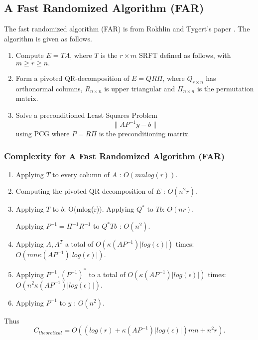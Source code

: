 \subsection{A Fast Randomized Algorithm (FAR)}
The fast randomized algorithm (FAR) is from Rokhlin and Tygert's paper \cite{SRFT2008}. The algorithm is given as follows.
\begin{tcolorbox}
\begin{enumerate}
\item Compute $E = TA$, where $T$ is the $r \times m$ SRFT defined as follows, with $m \geq r \geq n. $ \\
\item Form a pivoted QR-decomposition of $E = Q R \Pi$,  where $Q_{r \times n}$ has orthonormal columns, $R_{n \times n}$ is upper triangular and $\Pi_{n \times n}$ is the permutation matrix.  \\
\item Solve a preconditioned Least Squares Problem
$$
\| AP^{-1} y - b\|
$$
using PCG where $P = R \Pi$ is the preconditioning matrix.
\end{enumerate}
\end{tcolorbox}


\subsubsection{Complexity for A Fast Randomized Algorithm (FAR)}
\begin{tcolorbox}
\begin{enumerate}
\item Applying $T$ to every column of $A$ : $O(mnlog(r))$.  \\
\item Computing the pivoted QR decomposition of $E$ : $O(n^2r) . $ \\
\item Applying $T$ to $b$: O(mlog(r)). Applying $Q^*$ to $Tb$: $O(nr)$.

 Applying $P^{-1} = \Pi^{-1} R^{-1}$ to $Q^* Tb$ : $O(n^2). $ \\
\item Applying $A,A^T$ a total of $O(\kappa(AP^{-1}) |log(\epsilon)|)$ times: {\color{red}$O(mn\kappa(AP^{-1}) |log(\epsilon)|).$} \\
\item Applying $P^{-1},(P^{-1})^*$ to a total of $O(\kappa(AP^{-1}) |log(\epsilon)|)$ times: {\color{red}$O(n^2 \kappa(AP^{-1}) |log(\epsilon)|).$} \\
\item Applying $P^{-1}$ to $y$ : $O(n^2). $
\end{enumerate}
\end{tcolorbox}
Thus
{\color{red}
$$
C_{theoretical} = O((log(r) + \kappa(AP^{-1}) |log(\epsilon)|) mn +n^2r).
$$}





